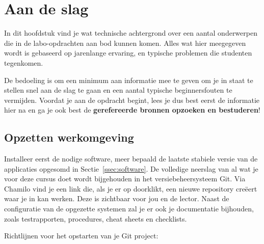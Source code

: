 \chapter{Aan de slag}
\label{ch:aan-de-slag}

In dit hoofdstuk vind je wat technische achtergrond over een aantal onderwerpen die in de labo-opdrachten aan bod kunnen komen. Alles wat hier meegegeven wordt is gebaseerd op jarenlange ervaring, en typische problemen die studenten tegenkomen.

De bedoeling is om een minimum aan informatie mee te geven om je in staat te stellen snel aan de slag te gaan en een aantal typische beginnersfouten te vermijden. Voordat je aan de opdracht begint, lees je dus best eerst de informatie hier na en ga je ook best de \textbf{gerefereerde bronnen opzoeken en bestuderen}!

\section{Opzetten werkomgeving}
\label{sec:opzetten_werkomgeving}

Installeer eerst de nodige software, meer bepaald de laatste stabiele versie van de applicaties opgesomd in Sectie~\ref{ssec:software}. De volledige neerslag van al wat je voor deze cursus doet wordt bijgehouden in het versiebeheersysteem Git. Via Chamilo vind je een link die, als je er op doorklikt, een nieuwe repository creëert waar je in kan werken. Deze is zichtbaar voor jou en de lector. Naast de configuratie van de opgezette systemen zal je er ook je documentatie bijhouden, zoals testrapporten, procedures, cheat sheets en checklists.

Richtlijnen voor het opstarten van je Git project:


